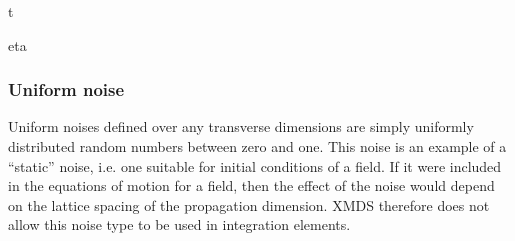 \documentclass[letterpaper,10pt,english]{sphinxmanual}
\begin{document}
\begin{sphinxVerbatim}[commandchars=\\\{\}]
 
         t 
                

      
            eta
\end{sphinxVerbatim}

\ignorespaces 

\subsubsection{Uniform noise}
\label{\detokenize{reference_elements:uniform-noise}}\label{\detokenize{reference_elements:uniformnoise}}\label{\detokenize{reference_elements:index-59}}
\sphinxAtStartPar
Uniform noises defined over any transverse dimensions are simply uniformly distributed random numbers between zero and one.  This noise is an example of a “static” noise, i.e. one suitable for initial conditions of a field.  If it were included in the equations of motion for a field, then the effect of the noise would depend on the lattice spacing of the propagation dimension.  XMDS therefore does not allow this noise type to be used in integration elements.
\end{document}

